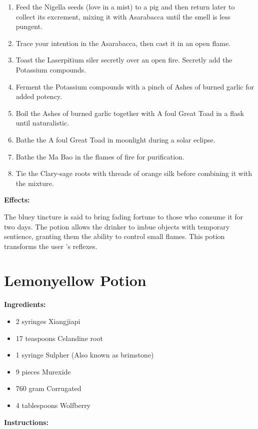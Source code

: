 \documentclass{article}
\begin{document}
\begin{enumerate}
  \item Feed the Nigella seeds (love in a mist) to a pig and then return later to collect its excrement, mixing it with Asarabacca until the smell is less pungent.
  \item Trace your intention in the Asarabacca, then cast it in an open flame.
  \item Toast the Laserpitium siler secretly over an open fire. Secretly add the Potassium compounds.
  \item Ferment the Potassium compounds with a pinch of Ashes of burned garlic for added potency.
  \item Boil the Ashes of burned garlic together with A foul Great Toad in a flask until naturalistic.
  \item Bathe the A foul Great Toad in moonlight during a solar eclipse.
  \item Bathe the Ma Bao in the flames of fire for purification.
  \item Tie the Clary-sage roots with threads of orange silk before combining it with the mixture.
\end{enumerate}

\textbf{Effects:}

The bluey tincture is said to bring fading fortune to those who consume it for two days. The potion allows the drinker to imbue objects with temporary sentience, granting them the ability to control small flames. This potion transforms the user 's reflexes.

\newpage
\section*{Lemonyellow Potion}

\textbf{Ingredients:}

\begin{itemize}
  \item 2 syringes Xiangjiapi
  \item 17 teaspoons Celandine root
  \item 1 syringe Sulpher (Also known as brimstone)
  \item 9 pieces Murexide
  \item 760 gram Corrugated
  \item 4 tablespoons Wolfberry
\end{itemize}

\textbf{Instructions:}
\end{document}
